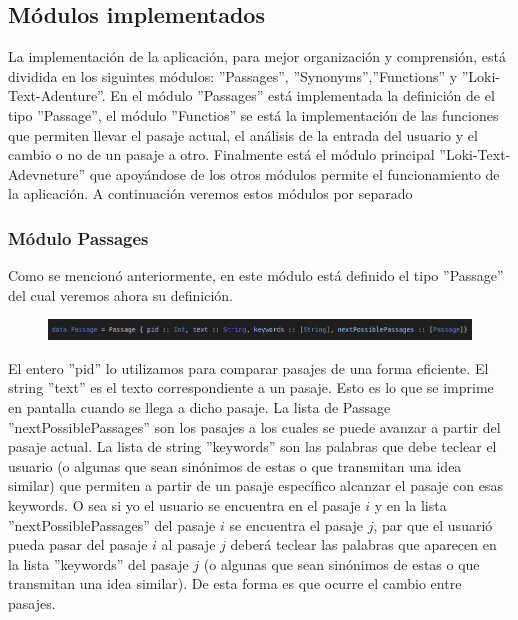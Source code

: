 \documentclass[12pt]{article}
\begin{document}
\subsection{M\'odulos implementados}

La implementaci\'on de la aplicaci\'on, para mejor organizaci\'on y comprensi\'on, est\'a dividida en los siguintes m\'odulos: ''Passages'', ''Synonyms'',''Functions'' y ''Loki-Text-Adenture''. En el m\'odulo ''Passages'' est\'a implementada la definici\'on de el tipo ''Passage'', el m\'odulo ''Functios'' se est\'a la implementaci\'on de las funciones que permiten llevar el pasaje actual, el an\'alisis de la entrada del usuario y el cambio o no de un pasaje a otro. Finalmente est\'a el m\'odulo principal ''Loki-Text-Adevneture'' que apoy\'andose de los otros m\'odulos permite el funcionamiento de la aplicaci\'on. A continuaci\'on veremos estos m\'odulos por separado 

\subsubsection{M\'odulo Passages}

Como se mencion\'o anteriormente, en este m\'odulo est\'a definido el tipo ''Passage'' del cual veremos ahora su definici\'on.

\begin{figure}[h]
	\begin{center}
		\includegraphics[width =15.0cm]{Passage.png}
	\end{center}
\end{figure}

El entero ''pid'' lo utilizamos para comparar pasajes de una forma eficiente. El string ''text'' es el texto correspondiente a un pasaje. Esto es lo que se imprime en pantalla cuando se llega a dicho pasaje. La lista de Passage ''nextPossiblePassages'' son los pasajes a los cuales se puede avanzar a partir del pasaje actual. La lista de string ''keywords'' son las palabras que debe teclear el usuario (o algunas que sean sin\'onimos de estas o que transmitan una idea similar) que permiten a partir de un pasaje espec\'ifico alcanzar el pasaje con esas keywords. O sea si yo el usuario se encuentra en el pasaje $i$ y en la lista ''nextPossiblePassages'' del pasaje $i$ se encuentra el pasaje $j$, par que el usuari\'o pueda pasar del pasaje $i$ al pasaje $j$ deber\'a teclear las palabras que aparecen en la lista ''keywords'' del pasaje $j$ (o algunas que sean sin\'onimos de estas o que transmitan una idea similar). De esta forma es que ocurre el cambio entre pasajes.
\end{document}
